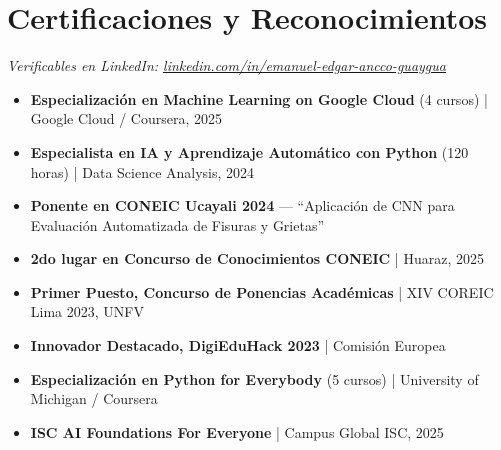 \documentclass[10pt, a4paper]{article}
\begin{document}
\section*{Certificaciones y Reconocimientos}
\textit{\small Verificables en LinkedIn: \href{https://www.linkedin.com/in/emanuel-edgar-ancco-guaygua-a61210352}{linkedin.com/in/emanuel-edgar-ancco-guaygua}}
\vspace{1mm}
\begin{itemize}
    \item \textbf{Especialización en Machine Learning on Google Cloud} (4 cursos) | Google Cloud / Coursera, 2025
    \item \textbf{Especialista en IA y Aprendizaje Automático con Python} (120 horas) | Data Science Analysis, 2024
    \item \textbf{Ponente en CONEIC Ucayali 2024} — ``Aplicación de CNN para Evaluación Automatizada de Fisuras y Grietas''
    \item \textbf{2do lugar en Concurso de Conocimientos CONEIC} | Huaraz, 2025
    \item \textbf{Primer Puesto, Concurso de Ponencias Académicas} | XIV COREIC Lima 2023, UNFV
    \item \textbf{Innovador Destacado, DigiEduHack 2023} | Comisión Europea
    \item \textbf{Especialización en Python for Everybody} (5 cursos) | University of Michigan / Coursera
    \item \textbf{ISC AI Foundations For Everyone} | Campus Global ISC, 2025
\end{itemize}
\end{document}
